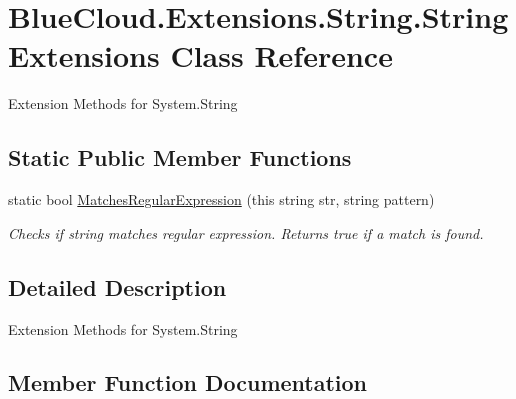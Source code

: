 \hypertarget{class_blue_cloud_1_1_extensions_1_1_string_1_1_string_extensions}{}\section{Blue\+Cloud.\+Extensions.\+String.\+String\+Extensions Class Reference}
\label{class_blue_cloud_1_1_extensions_1_1_string_1_1_string_extensions}


Extension Methods for System.\+String  


\subsection*{Static Public Member Functions}
\begin{DoxyCompactItemize}
\item 
static bool \mbox{\hyperlink{class_blue_cloud_1_1_extensions_1_1_string_1_1_string_extensions_a03d2f5cdf96a82f45530f795d132e0d0}{Matches\+Regular\+Expression}} (this string str, string pattern)
\begin{DoxyCompactList}\small\item\em Checks if string matches regular expression. Returns true if a match is found. \end{DoxyCompactList}\end{DoxyCompactItemize}


\subsection{Detailed Description}
Extension Methods for System.\+String 



\subsection{Member Function Documentation}
\mbox{\label{class_blue_cloud_1_1_extensions_1_1_string_1_1_string_extensions_a03d2f5cdf96a82f45530f795d132e0d0}} 
